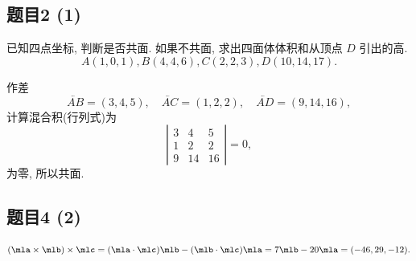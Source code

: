 \subsection*{ 题目2 (1) }
\begin{problem*}
已知四点坐标, 判断是否共面. 如果不共面, 求出四面体体积和从顶点 $D$ 引出的高.
\[
A(1, 0, 1), B(4, 4, 6), C(2, 2, 3), D(10, 14, 17).
\]
\end{problem*}
\begin{solution}
作差
\[
\lvec{AB} = (3, 4, 5), \quad \lvec{AC} = (1, 2, 2), \quad \lvec{AD} = (9, 14, 16),
\]
计算混合积(行列式)为
\[
\left|
\begin{matrix}
    3 & 4  & 5 \\
    1 & 2  & 2 \\
    9 & 14 & 16
\end{matrix}
\right| = 0,
\]
为零, 所以共面. 
\end{solution}

\subsection*{ 题目4 (2) }
\begin{solution}
\[
(\mla \times \mlb) \times \mlc = (\mla \cdot \mlc) \mlb - (\mlb \cdot \mlc) \mla = 7\mlb - 20\mla = (-46, 29, -12).
\]
\end{solution}


